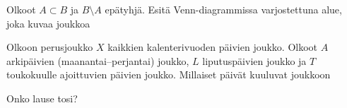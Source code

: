 \begin{kotitehtavasivu}
\begin{tehtava}
    \begin{vastaus}
    
    \end{vastaus}
\end{tehtava}


\begin{tehtava}
Olkoot $A \subset B$ ja $B \setminus A$ epätyhjä. Esitä Venn-diagrammissa varjostettuna alue, joka kuvaa joukkoa

%    
\end{tehtava}


\begin{tehtava}
Olkoon perusjoukko $X$ kaikkien kalenterivuoden päivien joukko. Olkoot $A$ arkipäivien (maanantai--perjantai) joukko, $L$ liputuspäivien joukko ja $T$ toukokuulle ajoittuvien päivien joukko. Millaiset päivät kuuluvat joukkoon

    \begin{vastaus}
    
    \end{vastaus}
\end{tehtava}

\begin{tehtava}
Onko lause tosi?

    \begin{vastaus}
    
    \end{vastaus}
\end{tehtava}



\end{kotitehtavasivu}

